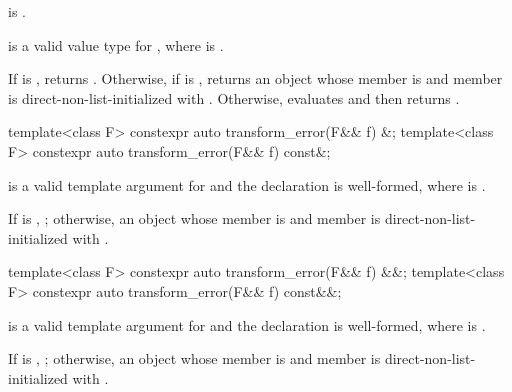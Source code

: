 \begin{itemdescr}
\pnum
\constraints
{} is .

\pnum
\mandates
{} is a valid value type for , where  is .

\pnum
\effects
If  is , returns . Otherwise, if  is , returns an  object whose  member is  and  member is direct-non-list-initialized with . Otherwise, evaluates  and then returns .
\end{itemdescr}

%
\begin{itemdecl}
template<class F> constexpr auto transform_error(F&& f) &;
template<class F> constexpr auto transform_error(F&& f) const&;
\end{itemdecl}

\begin{itemdescr}
\pnum
\mandates
{} is a valid template argument for  and the declaration  is well-formed, where  is .

\pnum
\returns
If  is , ; otherwise, an  object whose  member is  and  member is direct-non-list-initialized with .
\end{itemdescr}

%
\begin{itemdecl}
template<class F> constexpr auto transform_error(F&& f) &&;
template<class F> constexpr auto transform_error(F&& f) const&&;
\end{itemdecl}

\begin{itemdescr}
\pnum
\mandates
{} is a valid template argument for  and the declaration  is well-formed, where  is .

\pnum
\returns
If  is , ; otherwise, an  object whose  member is  and  member is direct-non-list-initialized with .
\end{itemdescr}


